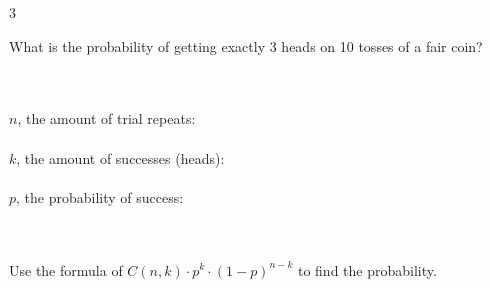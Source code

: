 \documentclass[a4paper,12pt]{book}
\newcounter{question}
\begin{document}
        \begin{question}{\thequestion}{3}

            What is the probability of getting exactly 3 heads
            on 10 tosses of a fair coin?


            ~\\~\\ \tab
            $n$, the amount of trial repeats: 
            ~\\~\\ \tab
            $k$, the amount of successes (heads): 
            ~\\~\\ \tab
            $p$, the probability of success: 

            ~\\~\\
            Use the formula of $ C(n, k) \cdot p^{k} \cdot (1 - p)^{n-k} $
            to find the probability.

        \end{question}

        \notonkey{ \newpage }{ \hrulefill }
        
\end{document}
